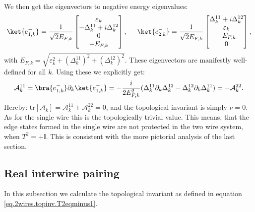 We then get the eigenvectors to negative energy eigenvalues:
\begin{equation}
\ket{e^{-}_{1,k}} = \frac{1}{\sqrt{2}E_{F,k}}\begin{bmatrix} \varepsilon_k \\ -\Delta^{11}_k + i\Delta^{12}_k \\ 0 \\ -E_{F,k} \end{bmatrix}, \hspace{0.5cm} \ket{e^{-}_{2,k}} = \frac{1}{\sqrt{2}E_{F,k}}\begin{bmatrix} \Delta^{11}_k + i\Delta^{12}_k \\ \varepsilon_k \\  -E_{F,k} \\ 0 \end{bmatrix},
\end{equation}
with $E_{F,k} = \sqrt{\varepsilon_k^2 + (\Delta^{11}_k)^2 + (\Delta^{12}_k)^2}$. These eigenvectors are manifestly well-defined for all $k$. Using these we explicitly get:
\begin{equation}
\mathcal{A}^{11}_k = \bra{e^{-}_{1,k}}\partial_k\ket{e^{-}_{1,k}} = -\frac{i}{2E_{F,k}^2}(\Delta^{11}_k\partial_k\Delta^{12}_k - \Delta^{12}_k\partial_k\Delta^{11}_k) = -\mathcal{A}^{22}_k. \nonumber
\end{equation}
Hereby: $\text{tr}[\mathcal{A}_k] = \mathcal{A}^{11}_k  + \mathcal{A}^{22}_k = 0$, and the topological invariant is simply $\nu = 0$. As for the single wire this is the topologically trivial value. This means, that the edge states formed in the single wire are not protected in the two wire system, when $T^2 = +\mathbb{I}$. This is consistent with the more pictorial analysis of the last section. 

\subsection{Real interwire pairing}
\label{subsec.2wires_CSinv_Delta12real}
In this subsection we calculate the topological invariant as defined in equation \eqref{eq.2wires.topinv.T2eqminus1}. 

